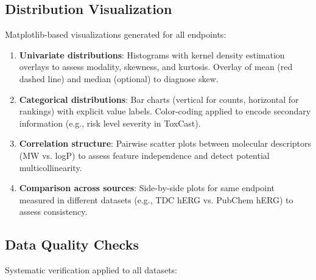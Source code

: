 \documentclass[a4paper,11pt,twoside]{report}
\begin{document}
\subsection{Distribution Visualization}

Matplotlib-based visualizations generated for all endpoints:

\begin{enumerate}
\item \textbf{Univariate distributions}: Histograms with kernel density estimation overlays to assess modality, skewness, and kurtosis. Overlay of mean (red dashed line) and median (optional) to diagnose skew.

\item \textbf{Categorical distributions}: Bar charts (vertical for counts, horizontal for rankings) with explicit value labels. Color-coding applied to encode secondary information (e.g., risk level severity in ToxCast).

\item \textbf{Correlation structure}: Pairwise scatter plots between molecular descriptors (MW vs. logP) to assess feature independence and detect potential multicollinearity.

\item \textbf{Comparison across sources}: Side-by-side plots for same endpoint measured in different datasets (e.g., TDC hERG vs. PubChem hERG) to assess consistency.
\end{enumerate}

\subsection{Data Quality Checks}

Systematic verification applied to all datasets:
\end{document}
